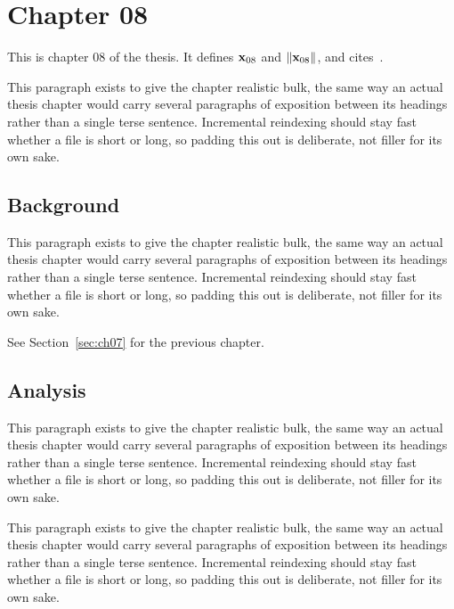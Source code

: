 \section{Chapter 08}
\label{sec:ch08}

This is chapter 08 of the thesis. It defines $\mathbf{x}_{08}$ and $\lVert \mathbf{x}_{08} \rVert$, and cites~\cite{ref1}.

This paragraph exists to give the chapter realistic bulk, the same way an actual thesis chapter would carry several paragraphs of exposition between its headings rather than a single terse sentence. Incremental reindexing should stay fast whether a file is short or long, so padding this out is deliberate, not filler for its own sake.

\subsection{Background}
\label{sec:ch08:background}

This paragraph exists to give the chapter realistic bulk, the same way an actual thesis chapter would carry several paragraphs of exposition between its headings rather than a single terse sentence. Incremental reindexing should stay fast whether a file is short or long, so padding this out is deliberate, not filler for its own sake.

See Section~\ref{sec:ch07} for the previous chapter.

\subsection{Analysis}
\label{sec:ch08:analysis}

This paragraph exists to give the chapter realistic bulk, the same way an actual thesis chapter would carry several paragraphs of exposition between its headings rather than a single terse sentence. Incremental reindexing should stay fast whether a file is short or long, so padding this out is deliberate, not filler for its own sake.

This paragraph exists to give the chapter realistic bulk, the same way an actual thesis chapter would carry several paragraphs of exposition between its headings rather than a single terse sentence. Incremental reindexing should stay fast whether a file is short or long, so padding this out is deliberate, not filler for its own sake.
